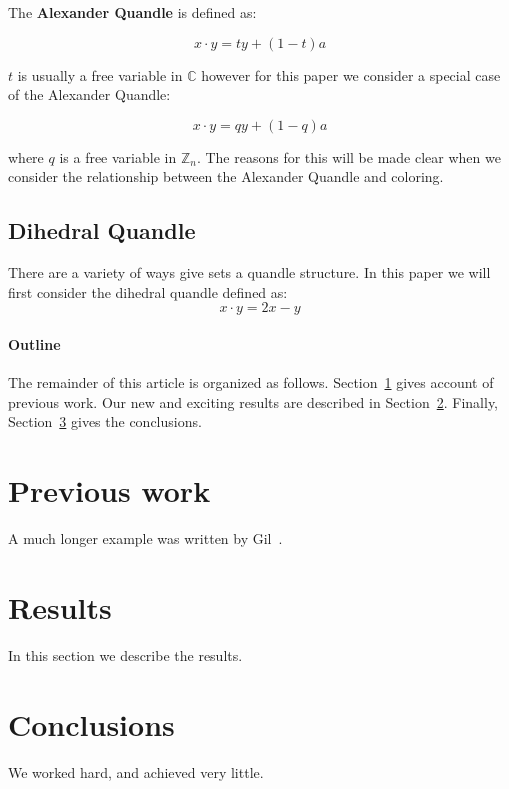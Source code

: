 \documentclass[12pt]{article}
\begin{document}
The \textbf{Alexander Quandle} is defined as:

$$ x \cdot y = ty + (1 - t)a $$

$t$ is usually a free variable in $\mathbb{C}$ however for this paper we consider a special case of the Alexander Quandle:

$$ x \cdot y = qy + (1 - q)a $$

where $q$ is a free variable in $\mathbb{Z}_n$. The reasons for this will be made clear when we consider the relationship between the Alexander Quandle and coloring.

\subsection{Dihedral Quandle}
There are a variety of ways give sets a quandle structure. In this paper we will first consider the dihedral quandle defined as:
$$x\cdot y = 2x - y$$

\paragraph{Outline}
The remainder of this article is organized as follows.
Section~\ref{previous work} gives account of previous work.
Our new and exciting results are described in Section~\ref{results}.
Finally, Section~\ref{conclusions} gives the conclusions.

\section{Previous work}\label{previous work}
A much longer \LaTeXe{} example was written by Gil~\cite{Gil:02}.

\section{Results}\label{results}
In this section we describe the results.

\section{Conclusions}\label{conclusions}
We worked hard, and achieved very little.



\end{document}

